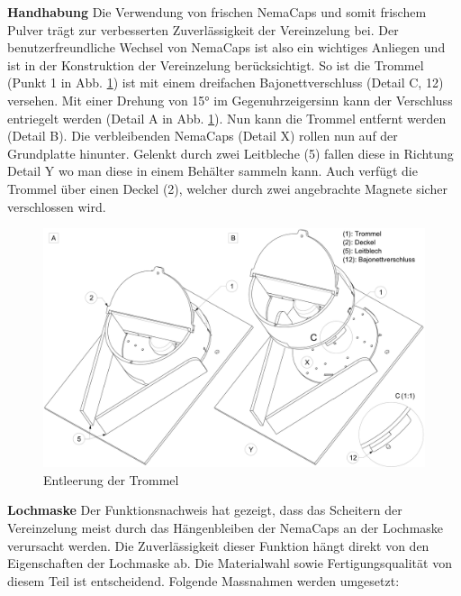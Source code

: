 \textbf{Handhabung}
\newline
Die Verwendung von frischen NemaCaps und somit frischem Pulver trägt zur verbesserten Zuverlässigkeit der Vereinzelung bei. Der benutzerfreundliche Wechsel von NemaCaps ist also ein wichtiges Anliegen und ist in der Konstruktion der Vereinzelung berücksichtigt. So ist die Trommel (Punkt 1 in Abb. \ref{fig:vereinzelung_entleeren}) ist mit einem dreifachen Bajonettverschluss (Detail C, 12) versehen. Mit einer Drehung von 15° im Gegenuhrzeigersinn kann der Verschluss entriegelt werden (Detail A in Abb. \ref{fig:vereinzelung_entleeren}). Nun kann die Trommel entfernt werden (Detail B). Die verbleibenden NemaCaps (Detail X) rollen nun auf der Grundplatte hinunter. Gelenkt durch zwei Leitbleche (5) fallen diese in Richtung Detail Y wo man diese in einem Behälter sammeln kann. Auch verfügt die Trommel über einen Deckel (2), welcher durch zwei angebrachte Magnete sicher verschlossen wird.
	\begin{figure}[H]
	\includegraphics[scale=0.42]{Illustrationen/6-Umsetzung/vereinzelung_entleeren.jpg}
	\caption{Entleerung der Trommel}
	\label{fig:vereinzelung_entleeren}
	\end{figure}
\textbf{Lochmaske}
\newline
Der Funktionsnachweis hat gezeigt, dass das Scheitern der Vereinzelung meist durch das Hängenbleiben der NemaCaps an der Lochmaske verursacht werden. Die Zuverlässigkeit dieser Funktion hängt direkt von den Eigenschaften der Lochmaske ab. Die Materialwahl sowie Fertigungsqualität von diesem Teil ist entscheidend. 
\newline
Folgende Massnahmen werden umgesetzt:
